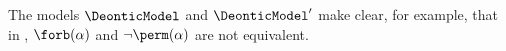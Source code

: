 \begin{example}
   \noindent The models $\DeonticModel$ and $\DeonticModel'$ make clear, for example, that in \DAL, $\forb(\alpha)$ and $\lnot\perm(\alpha)$ are not equivalent.





\end{example}

